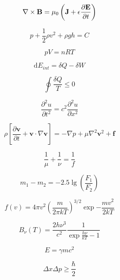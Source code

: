 \documentclass{article}
\begin{document}
\begin{equation}
    \nabla \times \mathbf{B} = \mu_0\left(\mathbf{J} + \epsilon \pdv{\mathbf{E}}{t}\right)
\end{equation}

\begin{equation}
    p + \frac{1}{2}\rho v^2 + \rho g h = C
\end{equation}

\begin{equation}
    pV = nRT
\end{equation}

\begin{equation}
    \mathrm{d}E_{int} = \delta Q - \delta W
\end{equation}

\begin{equation}
    \oint \frac{\delta Q}{T} \leq 0
\end{equation}

\begin{equation}
    \frac{\partial^2 u}{\partial t^2} = c^2 \frac{\partial^2 u}{\partial x^2}
\end{equation}

\begin{equation}
    \rho \left[\frac{\partial \mathbf{v}}{\partial t} + \mathbf{v} \cdot \nabla \mathbf{v}\right] = -\nabla p + \mu\nabla^2 \mathbf{v}^2 + \mathbf{f}
\end{equation}

\begin{equation}
    \frac{1}{\mu} + \frac{1}{\nu} = \frac{1}{f}
\end{equation}

\begin{equation}
    m_1 - m_2 = -2.5 \lg \left(\frac{F_1}{F_2}\right)
\end{equation}

\begin{equation}
    f(v) = 4\pi v^2 \left(\frac{m}{2\pi kT}\right)^{3/2} \exp{-\frac{mv^2}{2kT}}
\end{equation}

\begin{equation}
    B_\nu (T) = \frac{2h\nu^3}{c^2}\frac{1}{\exp{\frac{h\nu}{kT}}-1}
\end{equation}

\begin{equation}
    E = \gamma mc^2
\end{equation}

\begin{equation}
    \Delta x \Delta p \geq \frac{\hbar}{2}
\end{equation}
\end{document}
